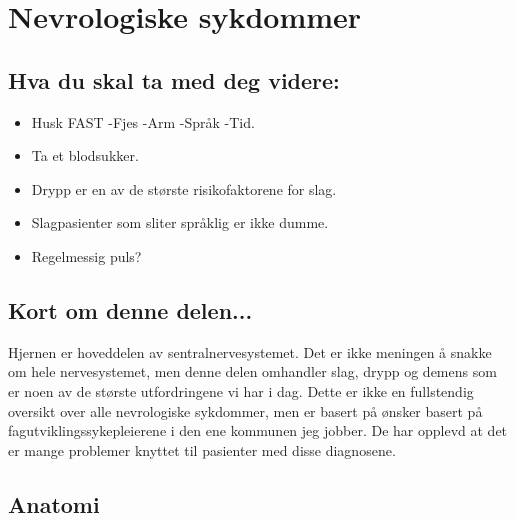  \chapter{Nevrologiske sykdommer}
		\section{Hva du skal ta med deg videre:}
			\begin{itemize}
				\item Husk FAST -Fjes -Arm -Språk -Tid.\\
				\item Ta et blodsukker.\\
				\item Drypp er en av de største risikofaktorene for slag.\\
				\item Slagpasienter som sliter språklig er ikke dumme.\\
				\item Regelmessig puls?\\
			\end{itemize}
		\section{Kort om denne delen...}
			Hjernen er hoveddelen av sentralnervesystemet. Det er ikke meningen å snakke om hele nervesystemet, men denne delen omhandler slag, drypp og demens som er noen av de største utfordringene vi har i dag. Dette er ikke en fullstendig oversikt over alle nevrologiske sykdommer, men er basert på ønsker basert på fagutviklingssykepleierene i den ene kommunen jeg jobber. De har opplevd at det er mange problemer knyttet til pasienter med disse diagnosene.
		\section{Anatomi}
